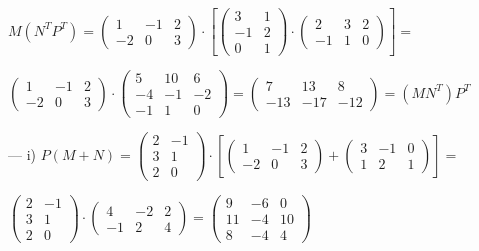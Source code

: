 \begin{proofw}
\noindent $M(N^TP^T)= \left( \begin{matrix} 1&-1&2\\-2&0&3   \end{matrix} \right) \cdot \left[
\left( \begin{matrix} 3&1\\-1&2\\0&1   \end{matrix} \right)
\cdot \left( \begin{matrix} 2&3&2\\-1&1&0   \end{matrix} \right)
\right] =$

\noindent $\left( \begin{matrix} 1&-1&2\\-2&0&3   \end{matrix} \right) \cdot
\left( \begin{matrix} 5&10&6\\ -4&-1&-2\\-1&1&0   \end{matrix} \right) = 
\left( \begin{matrix} 7&13&8\\-13&-17&-12   \end{matrix} \right) = (MN^T)P^T$

\small{\noindent --- i) $P(M+N)=
\left( \begin{matrix} 2&-1\\3&1\\2&0   \end{matrix} \right) \cdot
\left [
\left( \begin{matrix}  1&-1&2\\-2&0&3  \end{matrix} \right)  + 
\left( \begin{matrix} 3&-1&0\\1&2&1   \end{matrix} \right) 
\right]=$}

\small{\noindent $\left( \begin{matrix} 2&-1\\3&1\\2&0   \end{matrix} \right)  \cdot \left( \begin{matrix}  4&-2&2\\ -1&2&4  \end{matrix} \right) =
\left( \begin{matrix}  9&-6&0\\11&-4&10\\8&-4&4  \end{matrix} \right) $}




\end{proofw}
